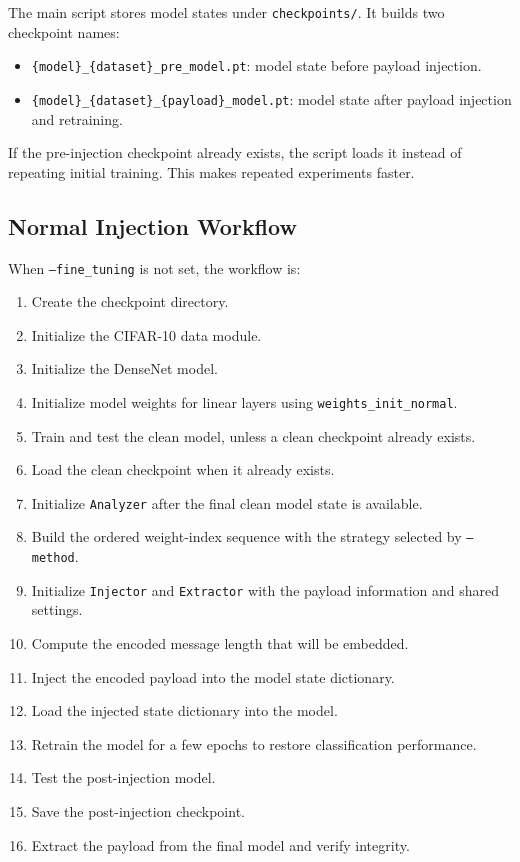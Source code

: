 \documentclass[11pt,a4paper]{article}
\newcommand{\code}[1]{\texttt{#1}}
\begin{document}
The main script stores model states under \code{checkpoints/}. It builds two checkpoint names:

\begin{itemize}[leftmargin=1.4em]
  \item \code{\{model\}\_\{dataset\}\_pre\_model.pt}: model state before payload injection.
  \item \code{\{model\}\_\{dataset\}\_\{payload\}\_model.pt}: model state after payload injection and retraining.
\end{itemize}

If the pre-injection checkpoint already exists, the script loads it instead of repeating initial training. This makes repeated experiments faster.

\subsection{Normal Injection Workflow}

When \code{--fine\_tuning} is not set, the workflow is:

\begin{enumerate}[leftmargin=1.6em]
  \item Create the checkpoint directory.
  \item Initialize the CIFAR-10 data module.
  \item Initialize the DenseNet model.
  \item Initialize model weights for linear layers using \code{weights\_init\_normal}.
  \item Train and test the clean model, unless a clean checkpoint already exists.
  \item Load the clean checkpoint when it already exists.
  \item Initialize \code{Analyzer} after the final clean model state is available.
  \item Build the ordered weight-index sequence with the strategy selected by \code{--method}.
  \item Initialize \code{Injector} and \code{Extractor} with the payload information and shared settings.
  \item Compute the encoded message length that will be embedded.
  \item Inject the encoded payload into the model state dictionary.
  \item Load the injected state dictionary into the model.
  \item Retrain the model for a few epochs to restore classification performance.
  \item Test the post-injection model.
  \item Save the post-injection checkpoint.
  \item Extract the payload from the final model and verify integrity.
\end{enumerate}
\end{document}
